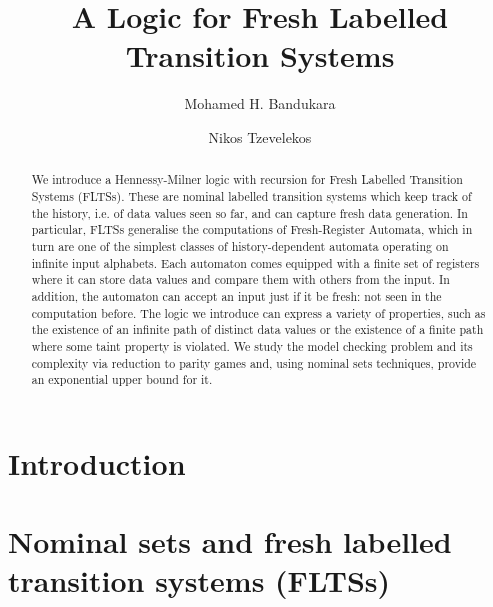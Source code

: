 \documentclass[a4paper,UKenglish,cleveref, autoref, thm-restate]{lipics-v2021}
\author{Mohamed H. Bandukara}{Queen Mary University of London, United Kingdom}{m.h.bandukara@qmul.ac.uk}{}{supported by EPSRC DTP EP/R513106/1.}
\author{Nikos Tzevelekos}{Queen Mary University of London, United Kingdom}{nikos.tzevelekos@qmul.ac.uk}{[orcid]}{}
\title{A Logic for Fresh Labelled Transition Systems}
\begin{document}
\maketitle
%
%
%
%
%
%
%
\begin{abstract}
We introduce a Hennessy-Milner logic with recursion for Fresh Labelled Transition Systems (FLTSs).
These are nominal labelled transition systems which keep track of the history, i.e. of data values seen so far, and can capture fresh data generation.
In particular, FLTSs generalise the computations of Fresh-Register Automata, which 
in turn are one of the simplest classes of history-dependent automata operating on infinite input alphabets.
Each automaton comes equipped with a finite set of registers where it can store data values and compare them with others from the input. In addition, the automaton can accept an input just if it be fresh: not seen in the computation before.
The logic we introduce can express a variety of properties, such as the existence of an infinite path of distinct data values or the existence of a finite path where some taint property is violated.
We study the model checking problem and its complexity via reduction to parity games and, using nominal sets techniques, provide an exponential upper bound for it.
\end{abstract}

\section{Introduction}




\section{Nominal sets and fresh labelled transition systems (FLTSs)}

\end{document}
